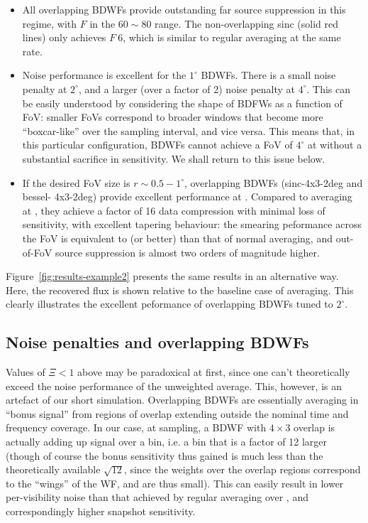 \documentclass[useAMS,usenatbib]{mn2e}
\begin{document}
\begin{itemize}

\item All overlapping BDWFs provide outstanding far source suppression in this regime, with $F$ in the $60\sim80$ range. 
The non-overlapping sinc (solid red lines) only achieves $F~6$, which is similar to regular averaging
at the same rate. 

\item Noise performance is excellent for the $1^\circ$ BDWFs. There is a small noise penalty at $2^\circ$, and a larger 
(over a factor of 2) noise penalty at $4^\circ$. This can be easily understood by considering the shape of BDFWs as
a function of FoV: smaller FoVs correspond to broader windows that become more ``boxcar-like'' over the sampling
interval, and vice versa. This means that, in this particular configuration, BDWFs cannot achieve a FoV of $4^\circ$
at  without a substantial sacrifice in sensitivity. We shall return to this issue below.

\item If the desired FoV size is $r\sim0.5-1^\circ$, overlapping BDWFs (sinc-4x3-2deg and bessel-
4x3-2deg) provide excellent performance at . Compared to averaging at , they achieve a factor
of 16 data compression with minimal loss of sensitivity, with excellent tapering behaviour: the smearing peformance 
across the FoV is equivalent to (or better) than that of normal averaging, and out-of-FoV source suppression is almost
two orders of magnitude higher.

\end{itemize}

Figure~\ref{fig:results-example2} presents the same results in an alternative way. Here, the recovered flux is shown 
relative to the baseline case of  averaging. This clearly illustrates the excellent peformance of overlapping
BDWFs tuned to $2^\circ$.

\subsection{Noise penalties and overlapping BDWFs}

Values of $\Xi<1$ above may be paradoxical at first, since one can't theoretically exceed the noise performance of the
unweighted average. This, however, is an artefact of our short simulation. Overlapping BDWFs are essentially
averaging in ``bonus signal'' from regions of overlap extending outside the nominal time and frequency 
coverage. In our case, at  sampling, a BDWF with $4\times3$ overlap is actually adding up signal over a
 bin, i.e. a bin that is a factor of 12 larger (though of course the bonus sensitivity thus gained is much
less than the theoretically available $\sqrt{12}$, since the weights over the overlap regions correspond
to the ``wings'' of the WF, and are thus small). This can easily result in lower per-visibility noise than that 
achieved by regular averaging over , and correspondingly higher snapshot sensitivity.
\end{document}
